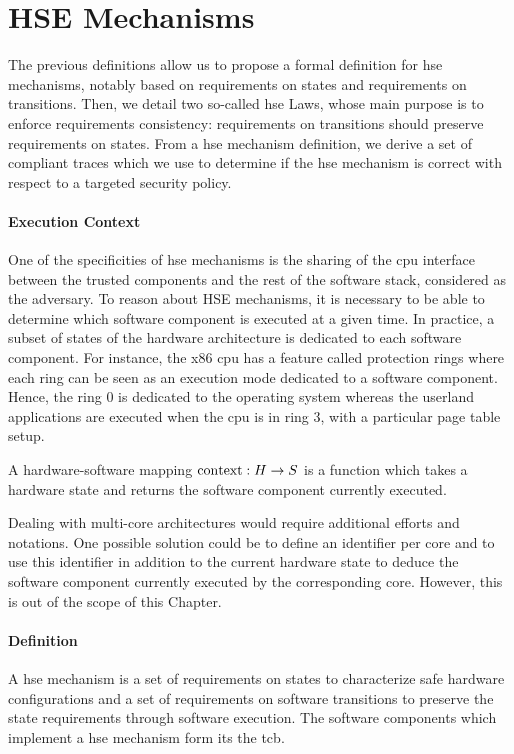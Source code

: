 \section{HSE Mechanisms}
\label{sec:speccert:hse}

The previous definitions allow us to propose a formal definition for \ac{hse}
mechanisms, notably based on requirements on states and requirements on
transitions.
%
Then, we detail two so-called \ac{hse} Laws, whose main purpose is to enforce
requirements consistency: requirements on transitions should preserve
requirements on states.
%
From a \ac{hse} mechanism definition, we derive a set of compliant traces which
we use to determine if the \ac{hse} mechanism is correct with respect to a
targeted security policy.

\paragraph{Execution Context}
%
One of the specificities of \ac{hse} mechanisms is the sharing of the \ac{cpu}
interface between the trusted components and the rest of the software stack,
considered as the adversary.
%
To reason about HSE mechanisms, it is necessary to be able to determine which
software component is executed at a given time.
%
In practice, a subset of states of the hardware architecture is dedicated to
each software component.
%
For instance, the x86 \ac{cpu} has a feature called protection rings where each
ring can be seen as an execution mode dedicated to a software component.
%
Hence, the ring 0 is dedicated to the operating system whereas the userland
applications are executed when the \ac{cpu} is in ring 3, with a particular page
table setup.

\begin{definition}
  \label{def:hardsoftmap}
  A hardware-software mapping $\mathrm{con\-text} : H \rightarrow S$ is a function
  which takes a hardware state and returns the software component currently
  executed.
\end{definition}

Dealing with multi-core architectures would require additional efforts and
notations.
%
One possible solution could be to define an identifier per core and to use this
identifier in addition to the current hardware state to deduce the software
component currently executed by the corresponding core.
%
However, this is out of the scope of this Chapter.

\paragraph{Definition}
%
A \ac{hse} mechanism is a set of requirements on states to characterize safe
hardware configurations and a set of requirements on software transitions to
preserve the state requirements through software execution.
%
The software components which implement a \ac{hse} mechanism form its the
\ac{tcb}.

